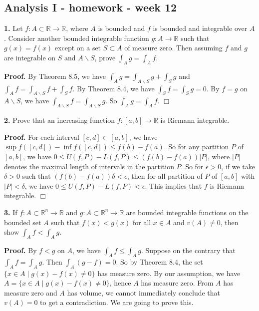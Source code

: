 \documentclass{article}
\begin{document}
    
    
    
    
    

    
    \subsection*{Analysis I - homework - week
12}\label{analysis-i---homework---week-12}

    \textbf{1.} Let $f:A\subset\mathbb{R}\to \mathbb{R}$, where $A$ is
bounded and $f$ is bounded and integrable over $A$. Consider another
bounded integrable function $g:A\to \mathbb{R}$ such that $g(x) = f(x)$
except on a set $S\subset A$ of measure zero. Then assuming $f$ and $g$
are integrable on $S$ and $A\backslash S$, prove $\int_A g = \int_A f$.

    \textbf{Proof.} By Theorem 8.5, we have
$\int_A g = \int_{A\backslash S} g + \int_S g$ and
$\int_A f = \int_{A\backslash S} f + \int_S f$. By Theorem 8.4, we have
$\int_S f = \int_S g = 0$. By $f =g$ on $A\backslash S$, we have
$\int_{A\backslash S}f = \int_{A\backslash S}g$. So
$\int_A g = \int_A f$. $\Box$

    \textbf{2.} Prove that an increasing function $f:[a,b]\to \mathbb{R}$ is
Riemann integrable.

    \textbf{Proof.} For each interval $[c,d] \subset [a,b]$, we have
$\sup{f([c,d])} - \inf{f([c,d])} \le f(b) - f(a)$. So for any partition
$P$ of $[a,b]$, we have $0\le U(f,P) - L(f,P) \le (f(b) - f(a)) |P|$,
where $|P|$ denotes the maximal length of intervals in the partition
$P$. So for $\epsilon > 0$, if we take $\delta > 0$ such that
$(f(b) - f(a) )\delta < \epsilon$, then for all partition of $P$ of
$[a,b]$ with $|P| < \delta$, we have $0\le U(f,P) - L(f,P) < \epsilon$.
This implies that $f$ is Riemann integrable. $\Box$

    \textbf{3.} If $f:A\subset \mathbb{R}^n \to \mathbb{R}$ and
$g:A \subset \mathbb{R}^n \to \mathbb{R}$ are bounded integrable
functions on the bounded set $A$ such that $f(x) < g(x)$ for all
$x\in A$ and $v(A) \ne 0$, then show $\int_A f < \int_A g$.

    \textbf{Proof.} By $f < g$ on $A$, we have $\int_A f \le \int_A g$.
Suppose on the contrary that $\int_A f = \int_A g$. Then
$\int_A (g -f) = 0$. So by Theorem 8.4, the set
$\{x \in A \mid g(x) - f(x) \ne 0\}$ has measure zero. By our
assumption, we have $A = \{x \in A \mid g(x) - f(x) \ne 0\}$, hence $A$
has measure zero. From $A$ has measure zero and $A$ has volume, we
cannot immediately conclude that $v(A) = 0$ to get a contradiction. We
are going to prove this.
\end{document}
